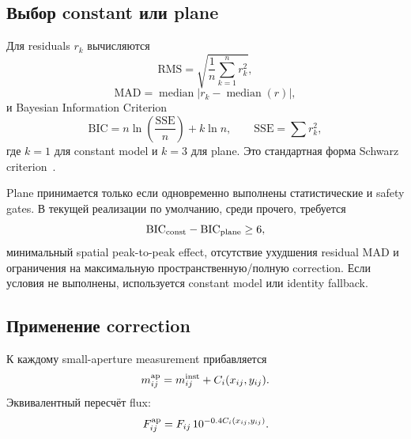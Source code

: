 \subsection{Выбор constant или plane}

Для residuals $r_k$ вычисляются
\begin{equation}
  \mathrm{RMS}=\sqrt{\frac{1}{n}\sum_{k=1}^{n}r_k^2},
\end{equation}
\begin{equation}
  \mathrm{MAD}=\operatorname{median}|r_k-\operatorname{median}(r)|,
\end{equation}
и Bayesian Information Criterion
\begin{equation}
  \mathrm{BIC}=n\ln\left(\frac{\mathrm{SSE}}{n}\right)+k\ln n,
  \qquad
  \mathrm{SSE}=\sum r_k^2,
  \label{eq:bic}
\end{equation}
где $k=1$ для constant model и $k=3$ для plane. Это стандартная форма Schwarz criterion~\cite{schwarz1978}.

Plane принимается только если одновременно выполнены статистические и safety gates. В текущей реализации по умолчанию, среди прочего, требуется
\begin{equation}
  \mathrm{BIC}_{\rm const}-\mathrm{BIC}_{\rm plane}\ge6,
\end{equation}
минимальный spatial peak-to-peak effect, отсутствие ухудшения residual MAD и ограничения на максимальную пространственную/полную correction. Если условия не выполнены, используется constant model или identity fallback.

\subsection{Применение correction}

К каждому small-aperture measurement прибавляется
\begin{equation}
  m^{\rm ap}_{ij}
  =m^{\rm inst}_{ij}+C_i(x_{ij},y_{ij}).
  \label{eq:aperture-apply}
\end{equation}
Эквивалентный пересчёт flux:
\begin{equation}
  F^{\rm ap}_{ij}
  =F_{ij}\,10^{-0.4C_i(x_{ij},y_{ij})}.
\end{equation}

